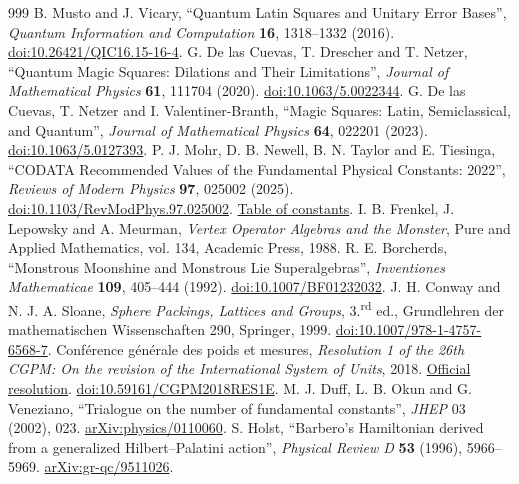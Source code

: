 \begin{thebibliography}{999}
 B. Musto and J. Vicary, ``Quantum Latin Squares and Unitary Error Bases'', \emph{Quantum Information and Computation} \textbf{16}, 1318--1332 (2016). \href{https://doi.org/10.26421/QIC16.15-16-4}{doi:10.26421/QIC16.15-16-4}.
 G. De las Cuevas, T. Drescher and T. Netzer, ``Quantum Magic Squares: Dilations and Their Limitations'', \emph{Journal of Mathematical Physics} \textbf{61}, 111704 (2020). \href{https://doi.org/10.1063/5.0022344}{doi:10.1063/5.0022344}.
 G. De las Cuevas, T. Netzer and I. Valentiner-Branth, ``Magic Squares: Latin, Semiclassical, and Quantum'', \emph{Journal of Mathematical Physics} \textbf{64}, 022201 (2023). \href{https://doi.org/10.1063/5.0127393}{doi:10.1063/5.0127393}.
 P. J. Mohr, D. B. Newell, B. N. Taylor and E. Tiesinga, ``CODATA Recommended Values of the Fundamental Physical Constants: 2022'', \emph{Reviews of Modern Physics} \textbf{97}, 025002 (2025). \href{https://doi.org/10.1103/RevModPhys.97.025002}{doi:10.1103/RevModPhys.97.025002}. \href{https://physics.nist.gov/cuu/Constants/Table/allascii.txt}{Table of constants}.
 I. B. Frenkel, J. Lepowsky and A. Meurman, \emph{Vertex Operator Algebras and the Monster}, Pure and Applied Mathematics, vol. 134, Academic Press, 1988.
 R. E. Borcherds, ``Monstrous Moonshine and Monstrous Lie Superalgebras'', \emph{Inventiones Mathematicae} \textbf{109}, 405--444 (1992). \href{https://doi.org/10.1007/BF01232032}{doi:10.1007/BF01232032}.
 J. H. Conway and N. J. A. Sloane, \emph{Sphere Packings, Lattices and Groups}, 3.\textsuperscript{rd} ed., Grundlehren der mathematischen Wissenschaften 290, Springer, 1999. \href{https://doi.org/10.1007/978-1-4757-6568-7}{doi:10.1007/978-1-4757-6568-7}.
 Conférence générale des poids et mesures, \emph{Resolution 1 of the 26th CGPM: On the revision of the International System of Units}, 2018. \href{https://www.bipm.org/en/committees/cg/cgpm/26-2018/resolution-1}{Official resolution}. \href{https://doi.org/10.59161/CGPM2018RES1E}{doi:10.59161/CGPM2018RES1E}.
 M. J. Duff, L. B. Okun and G. Veneziano, ``Trialogue on the number of fundamental constants'', \emph{JHEP} 03 (2002), 023. \href{https://arxiv.org/abs/physics/0110060}{arXiv:physics/0110060}.
 S. Holst, ``Barbero's Hamiltonian derived from a generalized Hilbert--Palatini action'', \emph{Physical Review D} \textbf{53} (1996), 5966--5969. \href{https://arxiv.org/abs/gr-qc/9511026}{arXiv:gr-qc/9511026}.

\end{thebibliography}
